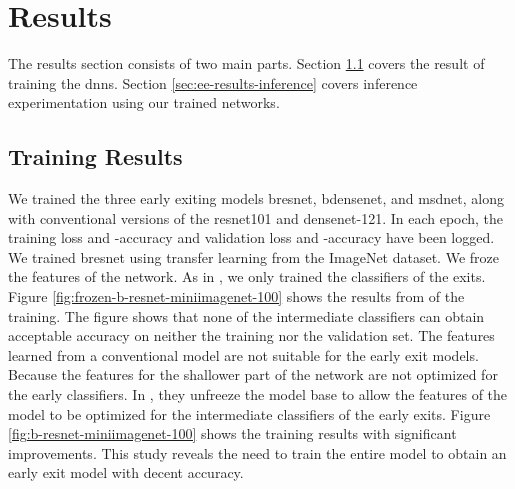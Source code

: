 \section{Results} \label{sec:ee-results}

The results section consists of two main parts. Section \ref{sec:ee-results-training} covers the result of training the \gls{dnn}s. Section \ref{sec:ee-results-inference} covers inference experimentation using our trained networks. 

\subsection{Training Results} \label{sec:ee-results-training}
We trained the three early exiting models \gls{bresnet}, \gls{bdensenet}, and \gls{msdnet}, along with conventional versions of the \gls{resnet}101 and \gls{densenet}-121.  In each epoch, the training loss and -accuracy and validation loss and -accuracy have been logged.
We trained \gls{bresnet} using transfer learning from the ImageNet dataset. We froze the features of the network. As in \cite{leroux_resource-constrained_2015}, we only trained the classifiers of the exits. Figure \ref{fig:frozen-b-resnet-miniimagenet-100} shows the results from of the training. The figure shows that none of the intermediate classifiers can obtain acceptable accuracy on neither the training nor the validation set. The features learned from a conventional model are not suitable for the early exit models. Because the features for the shallower part of the network are not optimized for the early classifiers. In \cite{teerapittayanon_branchynet:_2016}, they unfreeze the model base to allow the features of the model to be optimized for the intermediate classifiers of the early exits. Figure \ref{fig:b-resnet-miniimagenet-100} shows the training results with significant improvements. This study reveals the need to train the entire model to obtain an early exit model with decent accuracy.
